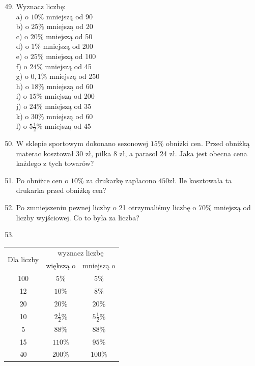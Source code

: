 \documentclass[10pt]{article}
\begin{document}
\begin{enumerate}
  \setcounter{enumi}{48}
  \item Wyznacz liczbę:\\
a) o \(10 \%\) mniejszą od 90\\
b) o \(25 \%\) mniejszą od 20\\
c) o \(20 \%\) mniejszą od 50\\
d) o \(1 \%\) mniejszą od 200\\
e) o \(25 \%\) mniejszą od 100\\
f) o \(24 \%\) mniejszą od 45\\
g) o \(0,1 \%\) mniejszą od 250\\
h) o \(18 \%\) mniejszą od 60\\
i) o \(15 \%\) mniejszą od 200\\
j) o \(24 \%\) mniejszą od 35\\
k) o \(30 \%\) mniejszą od 60\\
l) o \(5 \frac{1}{2} \%\) mniejszą od 45
  \item W sklepie sportowym dokonano sezonowej \(15 \%\) obniżki cen. Przed obniżką materac kosztował 30 zł, piłka 8 zł, a parasol 24 zł. Jaka jest obecna cena każdego z tych towarów?
  \item Po obniżce cen o \(10 \%\) za drukarkę zapłacono \(450 \mathrm{zł}\). Ile kosztowała ta drukarka przed obniżką cen?
  \item Po zmniejszeniu pewnej liczby o 21 otrzymaliśmy liczbę o \(70 \%\) mniejszą od liczby wyjściowej. Co to była za liczba?
  \item 
\end{enumerate}

\begin{center}
\begin{tabular}{|c|c|c|}
\hline
\multirow{2}{*}{Dla liczby} & \multicolumn{2}{|c|}{wyznacz liczbę} \\
\cline { 2 - 3 }
 & większą o & mniejszą o \\
\hline
100 & \(5 \%\) & \(5 \%\) \\
\hline
12 & \(10 \%\) & \(8 \%\) \\
\hline
20 & \(20 \%\) & \(20 \%\) \\
\hline
10 & \(2 \frac{1}{2} \%\) & \(5 \frac{1}{2} \%\) \\
\hline
5 & \(88 \%\) & \(88 \%\) \\
\hline
15 & \(110 \%\) & \(95 \%\) \\
\hline
40 & \(200 \%\) & \(100 \%\) \\
\hline
\end{tabular}
\end{center}
\end{document}
